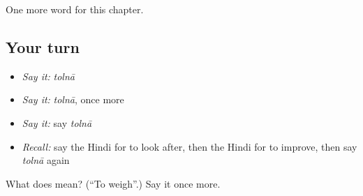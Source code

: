 \begin{grammarlens}[title={What you've built}]
One more word for this chapter.
\end{grammarlens}

\subsection*{Your turn}
\begin{itemize}
\raggedright
  \item \emph{Say it:} \emph{tolnā}
  \item \emph{Say it:} \emph{tolnā}, once more
  \item \emph{Say it:} say \emph{tolnā}
  \item \emph{Recall:} say the Hindi for to look after, then the Hindi for to improve, then say \emph{tolnā} again
\end{itemize}

\begin{tcolorbox}[breakable,colback=teal!4,colframe=teal!35!black,title={Before you move on}]
What does  mean? (\textquotedblleft{}To weigh\textquotedblright{}.) Say it once more.
\end{tcolorbox}
